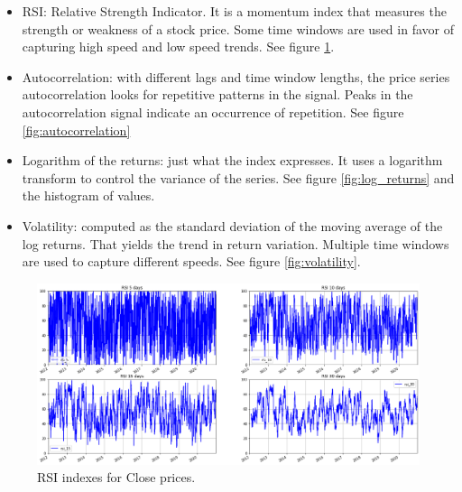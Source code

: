\begin{itemize}
  \item RSI: Relative Strength Indicator. It is a momentum index that measures
        the strength or weakness of a stock price. Some time windows are used in
        favor of capturing high speed and low speed trends. See figure
        \ref{fig:rsi}.
  \item Autocorrelation: with different lags and time window lengths, the price
        series autocorrelation looks for repetitive patterns in the signal.
        Peaks in the autocorrelation signal indicate an occurrence of
        repetition. See figure \ref{fig:autocorrelation}
  \item Logarithm of the returns: just what the index expresses. It uses a
        logarithm transform to control the variance of the series. See figure
        \ref{fig:log_returns} and the histogram of values.
  \item Volatility: computed as the standard deviation of the moving average of
        the log returns. That yields the trend in return variation. Multiple
        time windows are used to capture different speeds. See figure
        \ref{fig:volatility}.
\end{itemize}

\begin{figure}[H]
    \centering
    \includegraphics[width=\textwidth]{methods/images/rsi.png}
    \caption{RSI indexes for Close prices.}
    \label{fig:rsi}
\end{figure}

